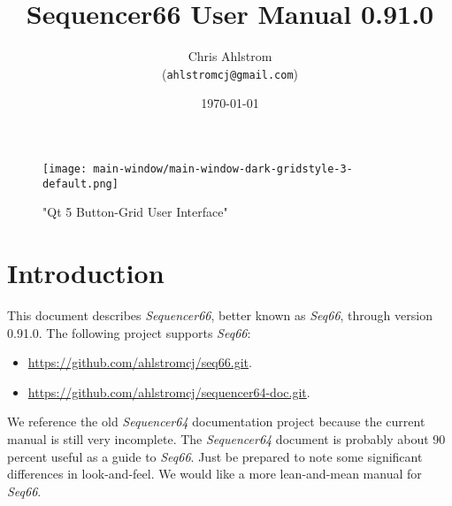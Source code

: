 \documentclass[
 11pt,
 twoside,
 a4paper,
 headinclude,
 footinclude,
 final                                 %
]{article}
\begin{document}
\title{Sequencer66 User Manual 0.91.0}
\author{Chris Ahlstrom \\
   (\texttt{ahlstromcj@gmail.com})}
\date{\today}
\maketitle


\begin{figure}[H]
   \centering 
   \texttt{[image: main-window/main-window-dark-gridstyle-3-default.png]}
   \caption*{"Qt 5 Button-Grid User Interface"}
\end{figure}

\clearpage                             %

\tableofcontents
\listoffigures                         %
\listoftables                          %


\setlength{\parindent}{2em}
\setlength{\parskip}{1ex plus 0.5ex minus 0.2ex}

\section{Introduction}
\label{sec:introduction}

   This document describes \textsl{Sequencer66}, better known as
   \textsl{Seq66},
   through version 0.91.0.
   The following project supports \textsl{Seq66}:

   \begin{itemize}
      \item \url{https://github.com/ahlstromcj/seq66.git}.
      \item \url{https://github.com/ahlstromcj/sequencer64-doc.git}.
   \end{itemize}

   We reference the old \textsl{Sequencer64} documentation project because
   the current manual is still very incomplete.  The \textsl{Sequencer64}
   document is probably about 90 percent useful as a guide to \textsl{Seq66}.
   Just be prepared to note some significant differences in look-and-feel.
   We would like a more lean-and-mean manual for \textsl{Seq66}.
\end{document}
